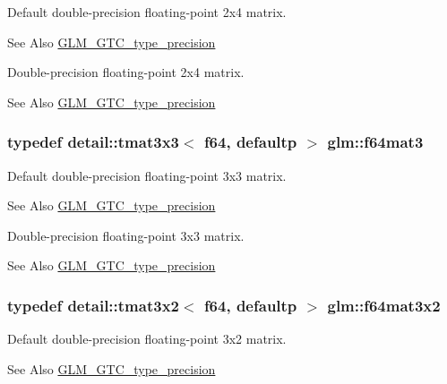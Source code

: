 Default double-\/precision floating-\/point 2x4 matrix. \begin{DoxySeeAlso}{See Also}
\hyperlink{group__gtc__type__precision}{G\-L\-M\-\_\-\-G\-T\-C\-\_\-type\-\_\-precision}
\end{DoxySeeAlso}
Double-\/precision floating-\/point 2x4 matrix. \begin{DoxySeeAlso}{See Also}
\hyperlink{group__gtc__type__precision}{G\-L\-M\-\_\-\-G\-T\-C\-\_\-type\-\_\-precision} 
\end{DoxySeeAlso}
\hypertarget{group__gtc__type__precision_gaa9e69ab90c0130b9a84a0a7fd8e49664}{
\subsubsection[{f64mat3}]{\setlength{\rightskip}{0pt plus 5cm}typedef detail\-::tmat3x3$<$ f64, defaultp $>$ {\bf glm\-::f64mat3}}}\label{group__gtc__type__precision_gaa9e69ab90c0130b9a84a0a7fd8e49664}
Default double-\/precision floating-\/point 3x3 matrix. \begin{DoxySeeAlso}{See Also}
\hyperlink{group__gtc__type__precision}{G\-L\-M\-\_\-\-G\-T\-C\-\_\-type\-\_\-precision}
\end{DoxySeeAlso}
Double-\/precision floating-\/point 3x3 matrix. \begin{DoxySeeAlso}{See Also}
\hyperlink{group__gtc__type__precision}{G\-L\-M\-\_\-\-G\-T\-C\-\_\-type\-\_\-precision} 
\end{DoxySeeAlso}
\hypertarget{group__gtc__type__precision_gae6388c7664b5bb281047a9fd7984f97b}{
\subsubsection[{f64mat3x2}]{\setlength{\rightskip}{0pt plus 5cm}typedef detail\-::tmat3x2$<$ f64, defaultp $>$ {\bf glm\-::f64mat3x2}}}\label{group__gtc__type__precision_gae6388c7664b5bb281047a9fd7984f97b}
Default double-\/precision floating-\/point 3x2 matrix. \begin{DoxySeeAlso}{See Also}
\hyperlink{group__gtc__type__precision}{G\-L\-M\-\_\-\-G\-T\-C\-\_\-type\-\_\-precision}
\end{DoxySeeAlso}
